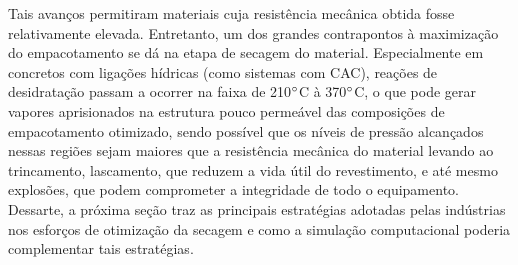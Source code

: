 Tais avanços permitiram materiais cuja resistência mecânica obtida fosse
relativamente elevada. Entretanto, um dos grandes contrapontos à maximização do
empacotamento se dá na etapa de secagem do material. Especialmente em concretos
com ligações hídricas (como sistemas com CAC), reações de desidratação passam a
ocorrer na faixa de 210$\degree$C à 370$\degree$C, o que pode gerar vapores
aprisionados na estrutura pouco permeável das composições de empacotamento
otimizado, sendo possível que os níveis de pressão alcançados nessas regiões
sejam maiores que a resistência mecânica do material levando ao trincamento,
lascamento, que reduzem a vida útil do revestimento, e até mesmo explosões, que
podem comprometer a integridade de todo o equipamento. Dessarte, a próxima seção
traz as principais estratégias adotadas pelas indústrias nos esforços de
otimização da secagem e como a simulação computacional poderia complementar tais
estratégias.
 

